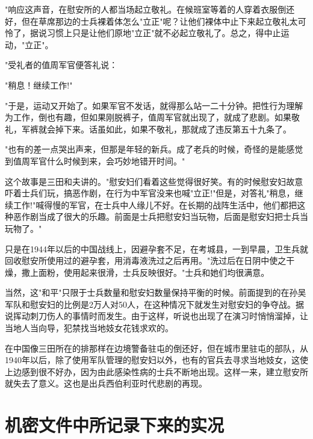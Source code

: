 \documentclass[12pt,UTF8]{ctexbook}
\begin{document}
"响应这声音，在慰安所的人都当场起立敬礼。在候班室等着的人穿着衣服倒还好，但在草席那边的士兵裸着体怎么"立正"呢？让他们裸体中止下来起立敬礼太可怜了，据说习惯上只是让他们原地"立正"就不必起立敬礼了。总之，得中止运动，"立正"。



"受礼者的值周军官便答礼说：



"稍息！继续工作!"



"于是，运动又开始了。如果军官不发话，就得那么站一二十分钟。把性行为理解为工作，倒也有趣，但如果刚脱裤子，值周军官就出现了，就成了悲剧。如果敬礼，军裤就会掉下来。话虽如此，如果不敬礼，那就成了违反第五十九条了。



"也有的差一点哭出声来，但那是年轻的新兵。成了老兵的时候，奇怪的是能感觉到值周军官什么时候到来，会巧妙地错开时间。"



这个故事是三田和夫讲的。"慰安妇们看着这些觉得很好笑。有的时候慰安妇故意吓着士兵们玩，搞恶作剧，在行为中军官没来也喊"立正!"但是，对答礼"稍息，继续工作!"喊得慢的军官，在士兵中人缘儿不好。在长期的战阵生活中，他们都把这种恶作剧当成了很大的乐趣。前面是士兵把慰安妇当玩物，后面是慰安妇把士兵当玩物了。"



只是在1944年以后的中国战线上，因避孕套不足，在考城县，一到早晨，卫生兵就回收慰安所使用过的避孕套，用消毒液洗过之后再用。"洗过后在日阴中使之干燥，撒上面粉，使用起来很滑，士兵反映很好。"士兵和她们均很满意。



当然，这"和平"只限于士兵数量和慰安妇数量保持平衡的时候。前面提到的在孙吴军队和慰安妇的比例是2万人对50人，在这种情况下就发生对慰安妇的争夺战。据说挥动刺刀伤人的事情时而发生。由于这样，听说也出现了在演习时悄悄溜掉，让当地人当向导，犯禁找当地妓女花钱求欢的。



在中国像三田所在的排那样在边境警备驻屯的倒还好，但在城市里驻屯的部队，从1940年以后，除了使用军队管理的慰安妇以外，也有的官兵去寻求当地妓女，这使上边感到很不好办，因为由此感染性病的士兵不断地出现。这样一来，建立慰安所就失去了意义。这也是出兵西伯利亚时代悲剧的再现。





\section{机密文件中所记录下来的实况}
\end{document}
